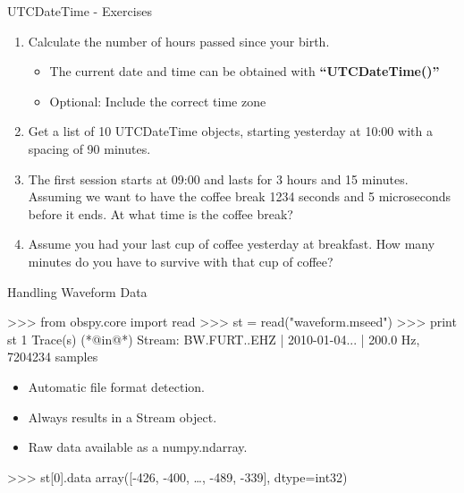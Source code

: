 \begin{frame}{UTCDateTime - Exercises}
    \begin{enumerate}
        \item Calculate the number of hours passed since your birth. \\
            \begin{itemize}
                \item The current date and time can be obtained with \textbf{``UTCDateTime()''}
                \item Optional: Include the correct time zone
            \end{itemize}
        \item Get a list of 10 UTCDateTime objects, starting yesterday at 10:00 with a spacing of 90 minutes.
        \item The first session starts at 09:00 and lasts for 3 hours and 15
            minutes. Assuming we want to have the coffee break 1234 seconds and
            5 microseconds before it ends. At what time is the coffee break?
        \item Assume you had your last cup of coffee yesterday at breakfast.
            How many minutes do you have to survive with that cup of coffee?
    \end{enumerate}


\end{frame}





\begin{frame}{Handling Waveform Data}
\begin{myColorBox}{0.95}{}
\begin{python}
>>> from obspy.core import read
>>> st = read("waveform.mseed")
>>> print st
1 Trace(s) (*@in@*) Stream:
BW.FURT..EHZ | 2010-01-04... | 200.0 Hz, 7204234 samples
\end{python}
\end{myColorBox}
\begin{itemize}
    \item Automatic file format detection.
    \item Always results in a Stream object.
    \item Raw data available as a numpy.ndarray.
\end{itemize}
\begin{myColorBox}{0.95}{}
\begin{python}
>>> st[0].data
array([-426, -400, \dots , -489, -339], dtype=int32)
\end{python}
\end{myColorBox}
\end{frame}

